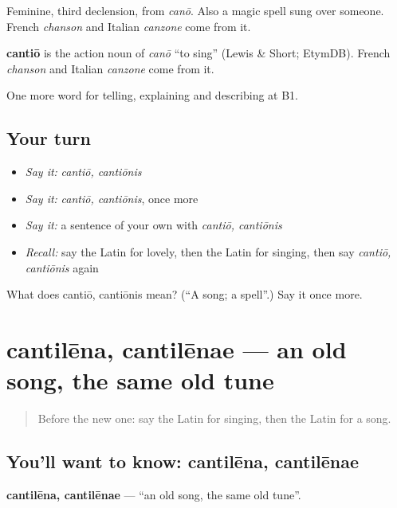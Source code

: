 Feminine, third declension, from \emph{canō}. Also a magic spell sung over someone. French \emph{chanson} and Italian \emph{canzone} come from it.

\begin{cousinweb}
\textbf{cantiō} is the action noun of \emph{canō} \textquotedblleft{}to sing\textquotedblright{} (Lewis \& Short; EtymDB). French \emph{chanson} and Italian \emph{canzone} come from it.
\end{cousinweb}

\begin{grammarlens}[title={What you've built}]
One more word for telling, explaining and describing at B1.
\end{grammarlens}

\subsection*{Your turn}
\begin{itemize}
\raggedright
  \item \emph{Say it:} \emph{cantiō, cantiōnis}
  \item \emph{Say it:} \emph{cantiō, cantiōnis}, once more
  \item \emph{Say it:} a sentence of your own with \emph{cantiō, cantiōnis}
  \item \emph{Recall:} say the Latin for lovely, then the Latin for singing, then say \emph{cantiō, cantiōnis} again
\end{itemize}

\begin{tcolorbox}[breakable,colback=teal!4,colframe=teal!35!black,title={Before you move on}]
What does cantiō, cantiōnis mean? (\textquotedblleft{}A song; a spell\textquotedblright{}.) Say it once more.
\end{tcolorbox}
\section[cantilēna, cantilēnae]{cantilēna, cantilēnae — an old song, the same old tune}

\label{lesson:LA-C543-cantilena}



\begin{quote}
Before the new one: say the Latin for singing, then the Latin for a song.
\end{quote}

\subsection*{You'll want to know: cantilēna, cantilēnae}
\textbf{cantilēna, cantilēnae} — \textquotedblleft{}an old song, the same old tune\textquotedblright{}.

